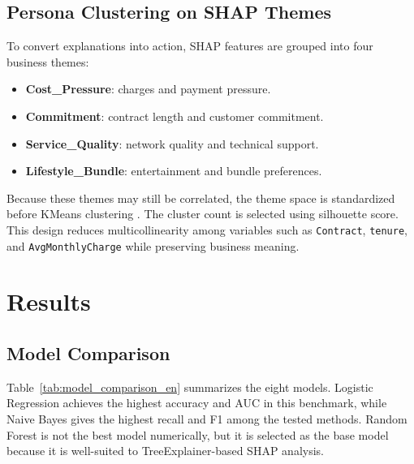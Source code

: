 \documentclass[conference]{IEEEtran}
\begin{document}
\subsection{Persona Clustering on SHAP Themes}
To convert explanations into action, SHAP features are grouped into four business themes:
\begin{itemize}[leftmargin=*]
    \item \textbf{Cost\_Pressure}: charges and payment pressure.
    \item \textbf{Commitment}: contract length and customer commitment.
    \item \textbf{Service\_Quality}: network quality and technical support.
    \item \textbf{Lifestyle\_Bundle}: entertainment and bundle preferences.
\end{itemize}

Because these themes may still be correlated, the theme space is standardized before KMeans clustering \cite{macqueen1967some}. The cluster count is selected using silhouette score. This design reduces multicollinearity among variables such as \texttt{Contract}, \texttt{tenure}, and \texttt{AvgMonthlyCharge} while preserving business meaning.

\section{Results}
\subsection{Model Comparison}
Table~\ref{tab:model_comparison_en} summarizes the eight models. Logistic Regression achieves the highest accuracy and AUC in this benchmark, while Naive Bayes gives the highest recall and F1 among the tested methods. Random Forest is not the best model numerically, but it is selected as the base model because it is well-suited to TreeExplainer-based SHAP analysis.

\begin{table}[t]
\centering
\caption{Model comparison}
\label{tab:model_comparison_en}
\end{table}
\end{document}

